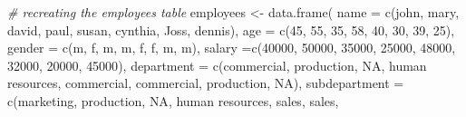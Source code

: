 \documentclass[
]{book}
\newenvironment{Shaded}{\begin{snugshade}}{\end{snugshade}}
\newcommand{\AttributeTok}[1]{\textcolor[rgb]{0.77,0.63,0.00}{#1}}
\newcommand{\CommentTok}[1]{\textcolor[rgb]{0.56,0.35,0.01}{\textit{#1}}}
\newcommand{\ConstantTok}[1]{\textcolor[rgb]{0.00,0.00,0.00}{#1}}
\newcommand{\DecValTok}[1]{\textcolor[rgb]{0.00,0.00,0.81}{#1}}
\newcommand{\FunctionTok}[1]{\textcolor[rgb]{0.00,0.00,0.00}{#1}}
\newcommand{\NormalTok}[1]{#1}
\newcommand{\OtherTok}[1]{\textcolor[rgb]{0.56,0.35,0.01}{#1}}
\newcommand{\StringTok}[1]{\textcolor[rgb]{0.31,0.60,0.02}{#1}}
\begin{document}
\begin{Shaded}
\begin{Highlighting}[]
\CommentTok{\# recreating the employees table}
\NormalTok{employees }\OtherTok{\textless{}{-}} \FunctionTok{data.frame}\NormalTok{(}
  \AttributeTok{name =} \FunctionTok{c}\NormalTok{(}\StringTok{\textquotesingle{}john\textquotesingle{}}\NormalTok{, }\StringTok{\textquotesingle{}mary\textquotesingle{}}\NormalTok{, }\StringTok{\textquotesingle{}david\textquotesingle{}}\NormalTok{, }\StringTok{\textquotesingle{}paul\textquotesingle{}}\NormalTok{, }\StringTok{\textquotesingle{}susan\textquotesingle{}}\NormalTok{, }\StringTok{\textquotesingle{}cynthia\textquotesingle{}}\NormalTok{, }\StringTok{\textquotesingle{}Joss\textquotesingle{}}\NormalTok{, }\StringTok{\textquotesingle{}dennis\textquotesingle{}}\NormalTok{),}
  \AttributeTok{age =} \FunctionTok{c}\NormalTok{(}\DecValTok{45}\NormalTok{, }\DecValTok{55}\NormalTok{, }\DecValTok{35}\NormalTok{, }\DecValTok{58}\NormalTok{, }\DecValTok{40}\NormalTok{, }\DecValTok{30}\NormalTok{, }\DecValTok{39}\NormalTok{, }\DecValTok{25}\NormalTok{),}
  \AttributeTok{gender =} \FunctionTok{c}\NormalTok{(}\StringTok{\textquotesingle{}m\textquotesingle{}}\NormalTok{, }\StringTok{\textquotesingle{}f\textquotesingle{}}\NormalTok{, }\StringTok{\textquotesingle{}m\textquotesingle{}}\NormalTok{, }\StringTok{\textquotesingle{}m\textquotesingle{}}\NormalTok{, }\StringTok{\textquotesingle{}f\textquotesingle{}}\NormalTok{, }\StringTok{\textquotesingle{}f\textquotesingle{}}\NormalTok{, }\StringTok{\textquotesingle{}m\textquotesingle{}}\NormalTok{, }\StringTok{\textquotesingle{}m\textquotesingle{}}\NormalTok{),}
  \AttributeTok{salary =}\FunctionTok{c}\NormalTok{(}\DecValTok{40000}\NormalTok{, }\DecValTok{50000}\NormalTok{, }\DecValTok{35000}\NormalTok{, }\DecValTok{25000}\NormalTok{, }\DecValTok{48000}\NormalTok{, }\DecValTok{32000}\NormalTok{, }\DecValTok{20000}\NormalTok{, }\DecValTok{45000}\NormalTok{),}
  \AttributeTok{department =} \FunctionTok{c}\NormalTok{(}\StringTok{\textquotesingle{}commercial\textquotesingle{}}\NormalTok{, }\StringTok{\textquotesingle{}production\textquotesingle{}}\NormalTok{, }\ConstantTok{NA}\NormalTok{, }\StringTok{\textquotesingle{}human resources\textquotesingle{}}\NormalTok{, }\StringTok{\textquotesingle{}commercial\textquotesingle{}}\NormalTok{, }
                 \StringTok{\textquotesingle{}commercial\textquotesingle{}}\NormalTok{, }\StringTok{\textquotesingle{}production\textquotesingle{}}\NormalTok{, }\ConstantTok{NA}\NormalTok{),}
  \AttributeTok{subdepartment =} \FunctionTok{c}\NormalTok{(}\StringTok{\textquotesingle{}marketing\textquotesingle{}}\NormalTok{, }\StringTok{\textquotesingle{}production\textquotesingle{}}\NormalTok{, }\ConstantTok{NA}\NormalTok{, }\StringTok{\textquotesingle{}human resources\textquotesingle{}}\NormalTok{, }\StringTok{\textquotesingle{}sales\textquotesingle{}}\NormalTok{, }\StringTok{\textquotesingle{}sales\textquotesingle{}}\NormalTok{, }

\end{Highlighting}
\end{Shaded}
\end{document}
